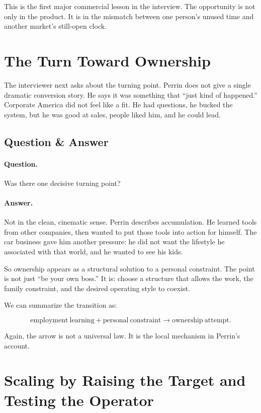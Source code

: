 This is the first major commercial lesson in the interview. The opportunity is not only in the product. It is in the mismatch between one person's unused time and another market's still-open clock.

\section{The Turn Toward Ownership}

The interviewer next asks about the turning point. Perrin does not give a single dramatic conversion story. He says it was something that ``just kind of happened.'' Corporate America did not feel like a fit. He had questions, he bucked the system, but he was good at sales, people liked him, and he could lead.

\subsection{Question \& Answer}

\paragraph{Question.}
Was there one decisive turning point?

\paragraph{Answer.}
Not in the clean, cinematic sense. Perrin describes accumulation. He learned tools from other companies, then wanted to put those tools into action for himself. The car business gave him another pressure: he did not want the lifestyle he associated with that world, and he wanted to see his kids.

So ownership appears as a structural solution to a personal constraint. The point is not just ``be your own boss.'' It is: choose a structure that allows the work, the family constraint, and the desired operating style to coexist.

We can summarize the transition as:

\begin{equation}
\mathrm{employment\ learning}
+
\mathrm{personal\ constraint}
\longrightarrow
\mathrm{ownership\ attempt}.
\end{equation}

Again, the arrow is not a universal law. It is the local mechanism in Perrin's account.

\section{Scaling by Raising the Target and Testing the Operator}

